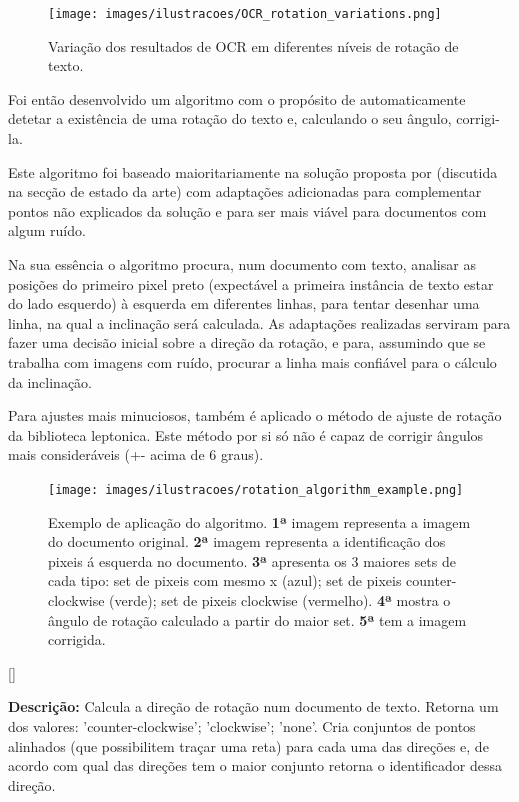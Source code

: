 \begin{figure}[H]
	\centering
	\texttt{[image: images/ilustracoes/OCR\_rotation\_variations.png]}
	\caption{Variação dos resultados de OCR em diferentes níveis de rotação de texto.}
	\label{fig:ocr_rotation_variations}
\end{figure}


Foi então desenvolvido um algoritmo com o propósito de automaticamente detetar a existência de uma rotação do texto e, calculando o seu ângulo, corrigi-la. 

Este algoritmo foi baseado maioritariamente na solução proposta por \cite{4283429} (discutida na secção de estado da arte) com adaptações adicionadas para complementar pontos não explicados da solução e para ser mais viável para documentos com algum ruído.

Na sua essência o algoritmo procura, num documento com texto, analisar as posições do primeiro pixel preto (expectável a primeira instância de texto estar do lado esquerdo) à esquerda em diferentes linhas, para tentar desenhar uma linha, na qual a inclinação será calculada. As adaptações realizadas serviram para fazer uma decisão inicial sobre a direção da rotação, e para, assumindo que se trabalha com imagens com ruído, procurar a linha mais confiável para o cálculo da inclinação.

Para ajustes mais minuciosos, também é aplicado o método de ajuste de rotação da biblioteca leptonica. Este método por si só não é capaz de corrigir ângulos mais consideráveis (+- acima de 6 graus).


\begin{figure}[H]
	\centering
	\texttt{[image: images/ilustracoes/rotation\_algorithm\_example.png]}
	\caption{Exemplo de aplicação do algoritmo. 
		\textbf{1ª} imagem representa a imagem do documento original. \textbf{2ª} imagem representa a identificação dos pixeis á esquerda no documento. \textbf{3ª} apresenta os 3 maiores sets de cada tipo: set de pixeis com mesmo x (azul); set de pixeis counter-clockwise (verde); set de pixeis clockwise (vermelho). \textbf{4ª} mostra o ângulo de rotação calculado a partir do maior set. \textbf{5ª} tem a imagem corrigida.}
	\label{fig:rotation_algorithm_example}
\end{figure}

[\normalsize]

\textbf{Descrição:} Calcula a direção de rotação num documento de texto. Retorna um dos valores: 'counter-clockwise'; 'clockwise'; 'none'. Cria conjuntos de pontos alinhados (que possibilitem traçar uma reta) para cada uma das direções e, de acordo com qual das direções tem o maior conjunto retorna o identificador dessa direção.

